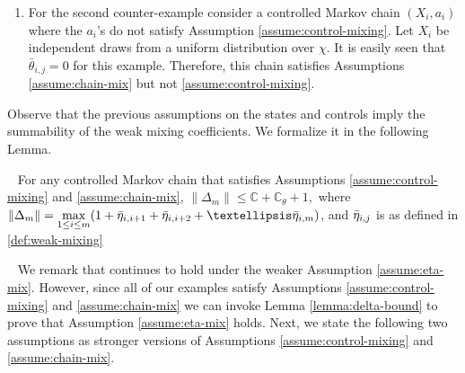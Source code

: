 \documentclass[opre,sglanonrev]{informs4}
\numberwithin{equation}{section}
\newcommand{\Cbb}{\mathbb{C}}
\newcommand{\constant}{\Cbb}
\begin{document}
{{\begin{enumerate}
    \item For the second counter-example consider a controlled Markov chain $(X_i,a_i)$ where the $a_i$'s do not satisfy Assumption \ref{assume:control-mixing}. Let $X_i$ be independent draws from a uniform distribution over $\chi$. It is easily seen that $\bar\theta_{i,j}=0$ for this example. Therefore, this chain satisfies Assumptions \ref{assume:chain-mix} but not \ref{assume:control-mixing}.
\end{enumerate}
%
Observe that the previous assumptions on the states and controls imply the summability of the weak mixing coefficients. We formalize it in the following Lemma.
\begin{lemma}~\label{lemma:delta-bound}
 For any controlled Markov chain that satisfies Assumptions \ref{assume:control-mixing} and \ref{assume:chain-mix},
$
    \lVert\Delta_m\rVert\leq \constant+\constant_{\theta}+1,
$
where $\|\Delta_m\|=\underset{1\leq i\leq m}{\max} (1+ \Bar{\eta}_{i,i+1}+ \Bar{\eta}_{i,i+2}+\dots \Bar{\eta}_{i,m})$, and $\Bar{\eta}_{i,j}$ is as defined in \cref{def:weak-mixing}
\end{lemma}
{
\begin{remark}~\label{remark:mixing-assume}
We remark that  continues to hold under the weaker Assumption \ref{assume:eta-mix}. 
However, { since all of our examples satisfy Assumptions \ref{assume:control-mixing} and \ref{assume:chain-mix} we can invoke Lemma \ref{lemma:delta-bound} to prove that Assumption \ref{assume:eta-mix} holds.} Next, we state the following two assumptions as stronger versions of Assumptions \ref{assume:control-mixing} and \ref{assume:chain-mix}.
\end{remark}

}}}
\end{document}
